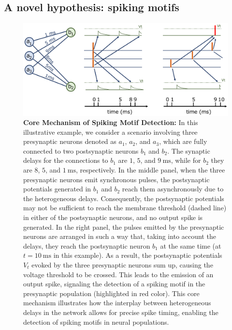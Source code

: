 \documentclass[runningheads]{llncs}
\newcommand{\ms}{\si{\milli\second}}%
\begin{document}
\subsection{A novel hypothesis: spiking motifs}
%
\begin{figure}%
  \centering
  \includegraphics[width=0.8\linewidth]{figures/izhikevich.pdf}%
    \caption{
      \textbf{Core Mechanism of Spiking Motif Detection:}
      In this illustrative example, we consider a scenario involving three presynaptic neurons denoted as $a_1$, $a_2$, and $a_3$, which are fully connected to two postsynaptic neurons $b_1$ and $b_2$. The synaptic delays for the connections to $b_1$ are $1$, $5$, and $9~\ms$, while for $b_2$ they are $8$, $5$, and $1~\ms$, respectively.
      In the middle panel, when the three presynaptic neurons emit synchronous pulses, the postsynaptic potentials generated in $b_1$ and $b_2$ reach them asynchronously due to the heterogeneous delays. Consequently, the postsynaptic potentials may not be sufficient to reach the membrane threshold (dashed line) in either of the postsynaptic neurons, and no output spike is generated.
      In the right panel, the pulses emitted by the presynaptic neurons are arranged in such a way that, taking into account the delays, they reach the postsynaptic neuron $b_1$ at the same time (at $t=10~\ms$ in this example). As a result, the postsynaptic potentials $V_t$ evoked by the three presynaptic neurons sum up, causing the voltage threshold to be crossed. This leads to the emission of an output spike, signaling the detection of a spiking motif in the presynaptic population (highlighted in red color).
      This core mechanism illustrates how the interplay between heterogeneous delays in the network allows for precise spike timing, enabling the detection of spiking motifs in neural populations. %
    }
  \label{fig:izhikevich}
\end{figure}
\end{document}
